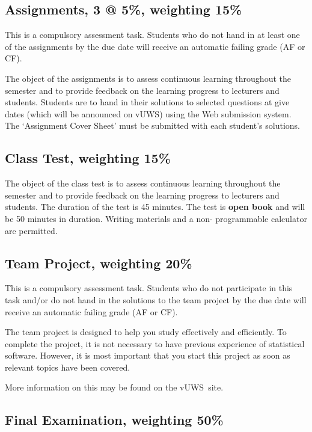 \documentclass[a4paper,oneside]{book}
\newcommand{\vuws}{vUWS}
\begin{document}
\subsection*{Assignments, 3 @ 5\%, weighting 15\%}
This is a compulsory assessment task. Students who do not hand in at
least one of the assignments by the due date will receive
an automatic failing grade (AF or CF).

The object of the assignments is to assess continuous
learning throughout the semester and to provide feedback on the
learning progress to lecturers and students. Students are to hand in
their solutions to selected questions at give dates (which will be announced on
\vuws) using the Web submission system.
The `Assignment Cover Sheet' must be submitted with each
student's solutions.

\subsection*{Class Test, weighting 15\%}

The object of the class test is to assess continuous learning
throughout the semester and to provide feedback on the learning
progress to lecturers and students. The duration of the test is 45
minutes. The test is \textbf{open book} and will be 50 minutes in
duration. Writing materials and a non- programmable calculator are
permitted.



\subsection*{Team Project, weighting 20\%}

This is a compulsory assessment task. Students who do not participate
in this task and/or do not hand in the solutions to the team project
by the due date will receive an automatic failing grade (AF or CF).

The team project is designed to help you study effectively and
efficiently. To complete the project, it is not necessary to have
previous experience of statistical software. However, it is most important that you
start this project as soon as relevant topics have been covered.

More information on this may be found on the \vuws~site.

\subsection*{Final Examination, weighting 50\%}
\end{document}

